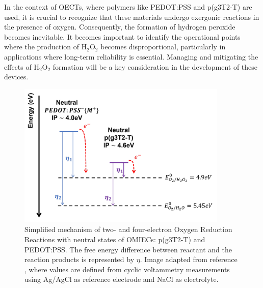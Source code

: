 In the context of OECTs, where polymers like PEDOT:PSS and p(g3T2-T) are used, it is crucial to recognize that these materials undergo exergonic reactions in the presence of oxygen. Consequently, the formation of hydrogen peroxide becomes inevitable. It becomes important to identify the operational points where the production of H$_{2}$O$_{2}$ becomes disproportional, particularly in applications where long-term reliability is essential. Managing and mitigating the effects of H$_2$O$_2$ formation will be a key consideration in the development of these devices.

\begin{figure}[!ht]
	\centering
	\includegraphics[width=10cm]{Images/pdf/ORR.pdf}
	\caption[Energy levels of neutral state of OMIECs related to oxygen reduction reactions potentials]{Simplified mechanism of two- and four-electron Oxygen Reduction Reactions with neutral states of OMIECs: p(g3T2-T) and PEDOT:PSS. The free energy difference between reactant and the reaction products is represented by $\eta$. Image adapted from reference \cite{giovannittiEnergeticControlRedoxActive2020}, where values are defined from cyclic voltammetry measurements using Ag/AgCl as reference electrode and NaCl as electrolyte.}
	\label{fig:orr}
\end{figure}





